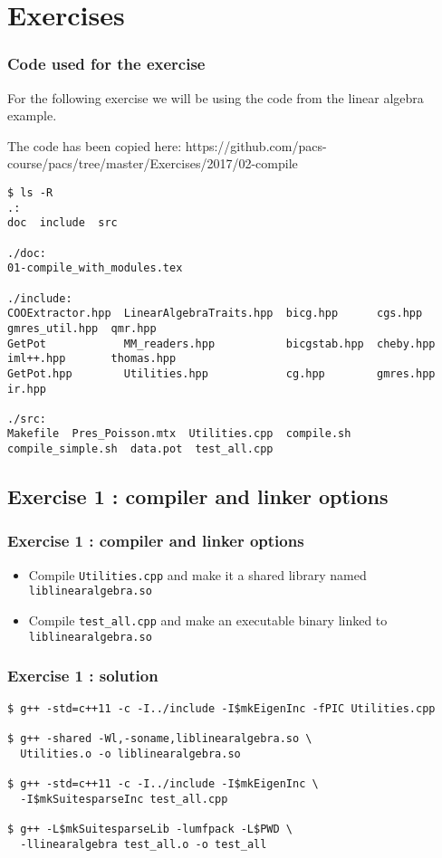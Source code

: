 \documentclass[9pt]{beamer}
\begin{document}
\section{Exercises}
\begin{frame}[fragile]
\frametitle{Code used for the exercise}

For the following exercise we will be using the code from the linear algebra example.

The code has been copied here: https://github.com/pacs-course/pacs/tree/master/Exercises/2017/02-compile

\tiny
\begin{verbatim}
$ ls -R
.:
doc  include  src

./doc:
01-compile_with_modules.tex

./include:
COOExtractor.hpp  LinearAlgebraTraits.hpp  bicg.hpp      cgs.hpp    gmres_util.hpp  qmr.hpp
GetPot            MM_readers.hpp           bicgstab.hpp  cheby.hpp  iml++.hpp       thomas.hpp
GetPot.hpp        Utilities.hpp            cg.hpp        gmres.hpp  ir.hpp

./src:
Makefile  Pres_Poisson.mtx  Utilities.cpp  compile.sh  compile_simple.sh  data.pot  test_all.cpp
\end{verbatim}

\end{frame}

\subsection{Exercise 1 : compiler and linker options}
\begin{frame}\frametitle{Exercise 1 : compiler and linker options}
\begin{itemize}
\item Compile {\tt Utilities.cpp} and make it a shared library named {\tt liblinearalgebra.so}\\[5mm]
\item Compile {\tt test\_all.cpp} and make an executable binary linked to {\tt liblinearalgebra.so}
\end{itemize}
\end{frame}

\begin{frame}[fragile]\frametitle{Exercise 1 : solution}
\begin{verbatim}
$ g++ -std=c++11 -c -I../include -I$mkEigenInc -fPIC Utilities.cpp

$ g++ -shared -Wl,-soname,liblinearalgebra.so \
  Utilities.o -o liblinearalgebra.so
  
$ g++ -std=c++11 -c -I../include -I$mkEigenInc \
  -I$mkSuitesparseInc test_all.cpp
  
$ g++ -L$mkSuitesparseLib -lumfpack -L$PWD \
  -llinearalgebra test_all.o -o test_all
  
\end{verbatim}


\end{frame}
\end{document}
